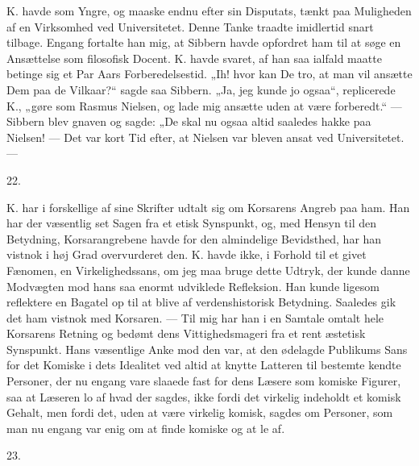 \documentclass[12pt,a4paper,openany]{book}
\newcommand{\secnum}[1]{\par\begin{center}#1\end{center}\par\nobreak}
\newcommand{\opage}[1]{\marginnote{\footnotesize\textit{[#1]}}}
\begin{document}
K. havde som Yngre, og maaske endnu efter sin Disputats, tænkt
paa Muligheden af en Virksomhed ved Universitetet. Denne Tanke
traadte imidlertid snart tilbage. Engang fortalte han mig, at
Sibbern havde opfordret ham til at søge en Ansættelse som
filosofisk Docent.
K. havde svaret, af han saa ialfald maatte betinge sig et Par
Aars Forberedelsestid. „Ih! hvor kan De tro, at man vil ansætte
Dem paa de Vilkaar?“ sagde saa Sibbern. „Ja, jeg kunde jo
ogsaa“, replicerede K., „gøre som Rasmus Nielsen, og lade mig
ansætte uden at være forberedt.“ --- Sibbern blev gnaven og sagde:
„De skal nu ogsaa altid saaledes hakke paa Nielsen! --- Det var
kort Tid efter, at Nielsen var bleven ansat ved Universitetet.
---\,\dotfill\par
\noindent\dotfill\par
\noindent\dotfill

\secnum{22.}

K. har i forskellige af sine Skrifter udtalt sig om Korsarens
Angreb paa ham. Han har der væsentlig set Sagen fra et etisk
Synspunkt, og, med Hensyn til den Betydning, Korsarangrebene
havde for den almindelige Bevidsthed, har han vistnok i høj Grad
overvurderet
\opage{353}den. K. havde ikke, i Forhold til et givet Fænomen, en
Virkelighedssans, om jeg maa bruge dette Udtryk, der kunde danne
Modvægten mod hans saa enormt udviklede Refleksion. Han kunde
ligesom reflektere en Bagatel op til at blive af verdenshistorisk
Betydning. Saaledes gik det ham vistnok med Korsaren. --- Til mig
har han i en Samtale omtalt hele Korsarens Retning og bedømt dens
Vittighedsmageri fra et rent æstetisk Synspunkt. Hans væsentlige
Anke mod den var, at den ødelagde Publikums Sans for det Komiske i
dets Idealitet ved altid at knytte Latteren til bestemte kendte
Personer, der nu engang vare slaaede fast for dens Læsere som
komiske Figurer, saa at Læseren lo af hvad der sagdes, ikke fordi
det virkelig indeholdt et komisk Gehalt, men fordi det, uden at
være virkelig komisk, sagdes om Personer, som man nu engang var
enig om at finde komiske og at le af.

\secnum{23.}
\end{document}
